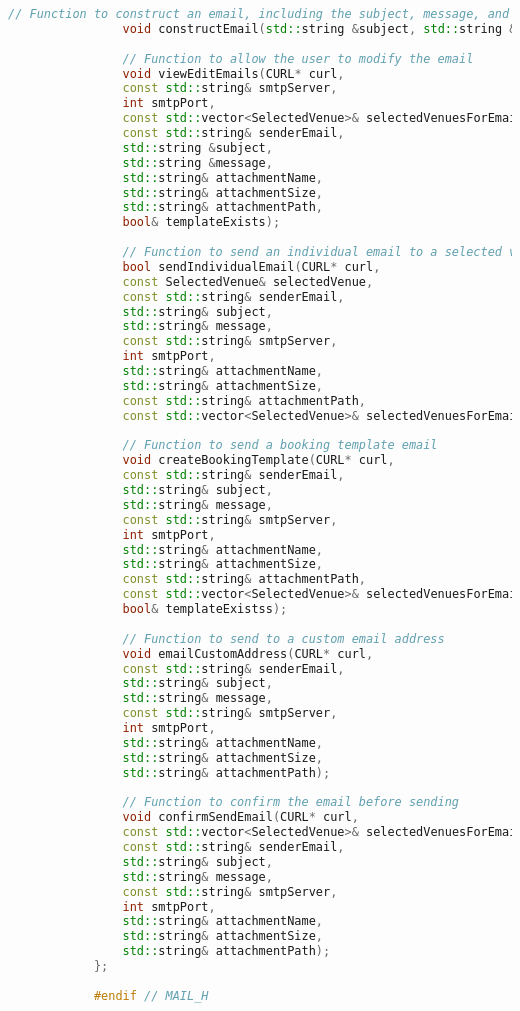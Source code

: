 \documentclass{article}
\begin{document}
\begin{mdframed}[backgroundcolor=background, hidealllines=false, innerleftmargin=15pt, innerrightmargin=5pt, innertopmargin=0pt, innerbottommargin=-5pt, linecolor=accent]
\begin{lstlisting}[language=C++]
				// Function to construct an email, including the subject, message, and attachment details
				void constructEmail(std::string &subject, std::string &message, std::string &attachmentPath, std::string &attachmentName, std::string &attachmentSize, std::istream &in = std::cin);
				
				// Function to allow the user to modify the email
				void viewEditEmails(CURL* curl, 
				const std::string& smtpServer,
				int smtpPort,
				const std::vector<SelectedVenue>& selectedVenuesForEmail,
				const std::string& senderEmail, 
				std::string &subject, 
				std::string &message, 
				std::string& attachmentName, 
				std::string& attachmentSize, 
				std::string& attachmentPath, 
				bool& templateExists);
				
				// Function to send an individual email to a selected venue
				bool sendIndividualEmail(CURL* curl,
				const SelectedVenue& selectedVenue,
				const std::string& senderEmail,
				std::string& subject,
				std::string& message,
				const std::string& smtpServer,
				int smtpPort,
				std::string& attachmentName,
				std::string& attachmentSize,
				const std::string& attachmentPath,
				const std::vector<SelectedVenue>& selectedVenuesForEmail);
				
				// Function to send a booking template email
				void createBookingTemplate(CURL* curl,
				const std::string& senderEmail,
				std::string& subject,
				std::string& message,
				const std::string& smtpServer,
				int smtpPort,
				std::string& attachmentName,
				std::string& attachmentSize,
				const std::string& attachmentPath,
				const std::vector<SelectedVenue>& selectedVenuesForEmail,
				bool& templateExistss);
				
				// Function to send to a custom email address
				void emailCustomAddress(CURL* curl,
				const std::string& senderEmail,
				std::string& subject,
				std::string& message,
				const std::string& smtpServer,
				int smtpPort,
				std::string& attachmentName,
				std::string& attachmentSize,
				std::string& attachmentPath);
				
				// Function to confirm the email before sending
				void confirmSendEmail(CURL* curl,
				const std::vector<SelectedVenue>& selectedVenuesForEmail,
				const std::string& senderEmail,
				std::string& subject,
				std::string& message,
				const std::string& smtpServer,
				int smtpPort,
				std::string& attachmentName,
				std::string& attachmentSize,
				std::string& attachmentPath);
			};
			
			#endif // MAIL_H
			
		\end{lstlisting}
	\end{mdframed}
	
\end{document}
